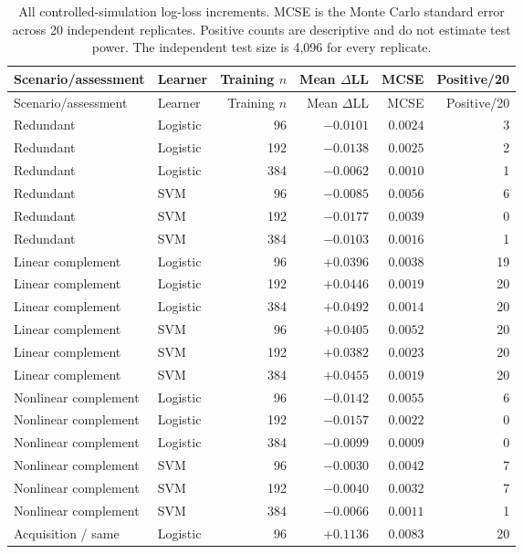 \begin{longtable}{llrrrr}
\caption{All controlled-simulation log-loss increments. MCSE is the Monte Carlo standard error across 20 independent replicates. Positive counts are descriptive and do not estimate test power. The independent test size is 4,096 for every replicate.}\label{tab:simulation-extension}\\
\toprule Scenario/assessment & Learner & Training $n$ & Mean $\Delta$LL & MCSE & Positive/20\\\midrule\endfirsthead
\toprule Scenario/assessment & Learner & Training $n$ & Mean $\Delta$LL & MCSE & Positive/20\\\midrule\endhead
\bottomrule\endfoot
Redundant & Logistic & 96 & $-0.0101$ & $0.0024$ & 3\\
Redundant & Logistic & 192 & $-0.0138$ & $0.0025$ & 2\\
Redundant & Logistic & 384 & $-0.0062$ & $0.0010$ & 1\\
Redundant & SVM & 96 & $-0.0085$ & $0.0056$ & 6\\
Redundant & SVM & 192 & $-0.0177$ & $0.0039$ & 0\\
Redundant & SVM & 384 & $-0.0103$ & $0.0016$ & 1\\
Linear complement & Logistic & 96 & $+0.0396$ & $0.0038$ & 19\\
Linear complement & Logistic & 192 & $+0.0446$ & $0.0019$ & 20\\
Linear complement & Logistic & 384 & $+0.0492$ & $0.0014$ & 20\\
Linear complement & SVM & 96 & $+0.0405$ & $0.0052$ & 20\\
Linear complement & SVM & 192 & $+0.0382$ & $0.0023$ & 20\\
Linear complement & SVM & 384 & $+0.0455$ & $0.0019$ & 20\\
Nonlinear complement & Logistic & 96 & $-0.0142$ & $0.0055$ & 6\\
Nonlinear complement & Logistic & 192 & $-0.0157$ & $0.0022$ & 0\\
Nonlinear complement & Logistic & 384 & $-0.0099$ & $0.0009$ & 0\\
Nonlinear complement & SVM & 96 & $-0.0030$ & $0.0042$ & 7\\
Nonlinear complement & SVM & 192 & $-0.0040$ & $0.0032$ & 7\\
Nonlinear complement & SVM & 384 & $-0.0066$ & $0.0011$ & 1\\
Acquisition / same & Logistic & 96 & $+0.1136$ & $0.0083$ & 20\\

\end{longtable}
